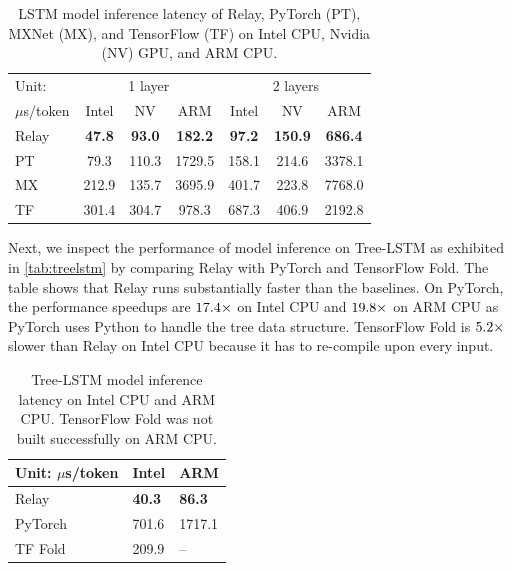     \begin{table}[t]
    \centering
    \small
    \begin{tabular}{p{0.9cm}|ccc|ccc}
    \toprule
    Unit: & \multicolumn{3}{c|}{1 layer} & \multicolumn{3}{c}{2 layers} \\
    $\mu$s/token & Intel & NV & ARM & Intel & NV & ARM \\ \midrule
    Relay & \bf{47.8} & \bf{93.0} & \bf{182.2} & \bf{97.2} & \bf{150.9} & \bf{686.4} \\
    PT & 79.3 & 110.3 & 1729.5 & 158.1 & 214.6 & 3378.1 \\
    MX  & 212.9 & 135.7 & 3695.9 & 401.7 & 223.8 & 7768.0 \\
    TF & 301.4 & 304.7 & 978.3 & 687.3 & 406.9 & 2192.8 \\
    \bottomrule
    \end{tabular}
    \caption{LSTM model inference latency of Relay, PyTorch (PT), MXNet (MX), and TensorFlow (TF) on Intel CPU, Nvidia (NV) GPU, and ARM CPU.}
    \label{tab:lstm}
    \end{table}

    Next, we inspect the performance of model inference on Tree-LSTM as exhibited in \autoref{tab:treelstm} by comparing Relay with PyTorch and TensorFlow Fold. The table shows that Relay runs substantially faster than the baselines. On PyTorch, the performance speedups are $\fpeval{round(701.1/40.3, 1)}\times$ on Intel CPU and $\fpeval{round(1711.1/86.3, 1)}\times$ on ARM CPU as PyTorch uses Python to handle the tree data structure. TensorFlow Fold is $\fpeval{round(209.9/40.3, 1)}\times$ slower than Relay on Intel CPU because it has to re-compile upon every input.

    \begin{table}[t]
    \centering
    \begin{tabular}{l|ll}
    \toprule
    Unit: $\mu$s/token        & Intel     & ARM \\ \midrule
    Relay  & \bf{40.3}  & \bf{86.3}  \\
    PyTorch & 701.6 & 1717.1  \\
    TF Fold & 209.9 & --  \\
    \bottomrule
    \end{tabular}
    \caption{Tree-LSTM model inference latency on Intel CPU and ARM CPU. TensorFlow Fold was not built successfully on ARM CPU.}
    \label{tab:treelstm}
    \end{table}

